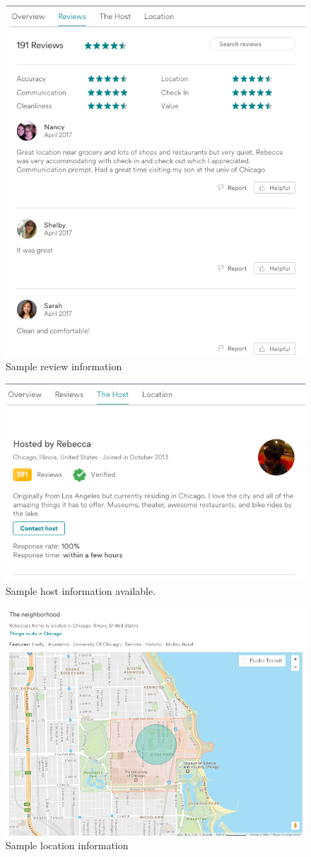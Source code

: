 \begin{figure}[!ht]\centering
\includegraphics[width=.8\textwidth]{figures/sample3-reviews}
\caption{Sample review information}
\end{figure}
\begin{figure}\centering
\includegraphics[width=.9\textwidth]{figures/sample4-host}
\caption[Sample host information]{Sample host information available.}
\end{figure}
\begin{figure}\centering
\includegraphics[width=.8\textwidth]{figures/sample5-location}
\caption{Sample location information}
\end{figure}
